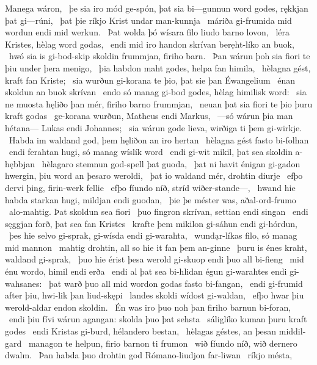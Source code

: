 Manega wáron, \hld\ þe sia iro mód ge-spón,
þat sia bi—gunnun word godes,
rękkjan þat gi—rúni, \hld\ þat þie ríkjo Krist
undar man-kunnja \hld\ máriða gi-frumida
mid wordun endi mid werkun. \hld\ Þat wolda þó wísara filo
liudo barno lovon, \hld\ léra Kristes,
hèlag word godas, \hld\ endi mid iro handon skrívan
berẹht-líko an buok, \hld\ hwó sia is gi-bod-skip skoldin
frummjan, firiho barn. \hld\ Þan wárun þoh sia fiori te þiu
under þera menigo, \hld\ þia habdon maht godes,
helpa fan himila, \hld\ hèlagna gést,
kraft fan Kriste; \hld\ sia wurðun gi-korana te þio,
þat sie þan Éwangelium \hld\ énan skoldun
an buok skrívan \hld\ endo só manag gi-bod godes,
hèlag himilisk word: \hld\ sia ne muosta hęliðo þan mér,
firiho barno frummjan, \hld\ neuan þat sia fiori te þio
þuru kraft godas \hld\ ge-korana wurðun,
Matheus endi Markus, \hld\ —só wárun þia man hétana—
Lukas endi Johannes; \hld\ sia wárun gode lieva,
wirðiga ti þem gi-wirkje. \hld\ Habda im waldand god,
þem hęliðon an iro hertan \hld\ hèlagna gést
fasto bi-folhan \hld\ endi ferahtan hugi,
só manag wíslík word \hld\ endi gi-wit mikil,
þat sea skoldin a-hębbjan \hld\ hèlagaro stemnun
god-spell þat guoda, \hld\ þat ni havit énigan gi-gadon hwergin,
þiu word an þesaro weroldi, \hld\ þat io waldand mér,
drohtin diurje \hld\ efþo dervi þing,
firin-werk fellie \hld\ efþo fíundo níð,
stríd wiðer-stande—, \hld\ hwand hie habda starkan hugi,
mildjan endi guodan, \hld\ þie þe méster was,
aðal-ord-frumo \hld\ alo-mahtig.
Þat skoldun sea fiori \hld\ þuo fingron skrívan,
settian endi singan \hld\ endi sęggjan forð,
þat sea fan Kristes \hld\ krafte þem mikilon
gi-sáhun endi gi-hórdun, \hld\ þes hie selvo gi-sprak,
gi-wísda endi gi-warahta, \hld\ wundạr-líkas filo,
só manag mid mannon \hld\ mahtig drohtin,
all so hie it fan þem an-ginne \hld\ þuru is énes kraht,
waldand gi-sprak, \hld\ þuo hie érist þesa werold gi-skuop
endi þuo all bi-fieng \hld\ mid énu wordo,
himil endi erða \hld\ endi al þat sea bi-hlidan égun
gi-warahtes endi gi-wahsanes: \hld\ þat warð þuo all mid wordon godas
fasto bi-fangan, \hld\ endi gi-frumid after þiu,
hwi-lik þan liud-skępi \hld\ landes skoldi
wídost gi-waldan, \hld\ efþo hwar þiu werold-aldar
endon skoldin. \hld\ Én was iro þuo noh þan
firiho barnun bi-foran, \hld\ endi þiu fívi wárun agangan:
skolda þuo þat sehsta \hld\ sáliglíko
kuman þuru kraft godes \hld\  endi Kristas gi-burd,
hélandero bestan, \hld\ hèlagas géstes,
an þesan middil-gard \hld\ managon te helpun,
firio barnon ti frumon \hld\ wið fíundo níð,
wið dernero dwalm. \hld\ Þan habda þuo drohtin god
Rómano-liudjon far-liwan \hld\ ríkjo mésta,
